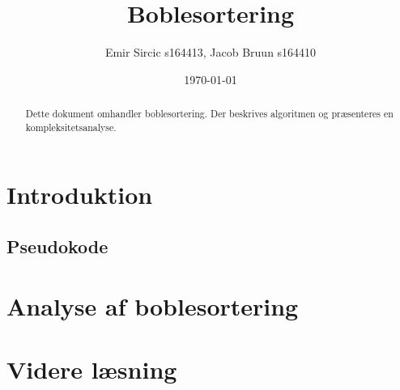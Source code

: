 \documentclass[a4paper]{article}
\begin{document}
\title{Boblesortering}
\author{Emir Sircic s164413, Jacob Bruun s164410}
\date{\today}

\maketitle
\begin{abstract}
Dette dokument omhandler boblesortering. Der beskrives algoritmen
og præsenteres en kompleksitetsanalyse.
\end{abstract}
\section{Introduktion}
\subsection{Pseudokode}
\section{Analyse af boblesortering}
\section{Videre læsning}
\end{document}
